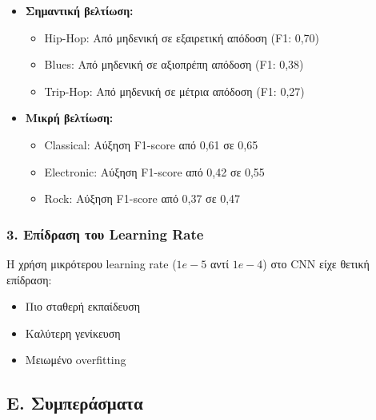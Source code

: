 \documentclass[a4paper,12pt]{article}
\begin{document}
\begin{itemize}
    \item \textbf{Σημαντική βελτίωση:}
    \begin{itemize}
        \item Hip-Hop: Από μηδενική σε εξαιρετική απόδοση (F1: 0,70)
        \item Blues: Από μηδενική σε αξιοπρέπη απόδοση (F1: 0,38)
        \item Trip-Hop: Από μηδενική σε μέτρια απόδοση (F1: 0,27)
    \end{itemize}
    
    \item \textbf{Μικρή βελτίωση:}
    \begin{itemize}
        \item Classical: Αύξηση F1-score από 0,61 σε 0,65
        \item Electronic: Αύξηση F1-score από 0,42 σε 0,55
        \item Rock: Αύξηση F1-score από 0,37 σε 0,47
    \end{itemize}
\end{itemize}

\subsubsection*{3. Επίδραση του Learning Rate}
Η χρήση μικρότερου learning rate ($1e-5$ αντί $1e-4$) στο CNN είχε θετική επίδραση:
\begin{itemize}
    \item Πιο σταθερή εκπαίδευση
    \item Καλύτερη γενίκευση
    \item Μειωμένο overfitting
\end{itemize}

\subsection*{Ε. Συμπεράσματα}
\end{document}
